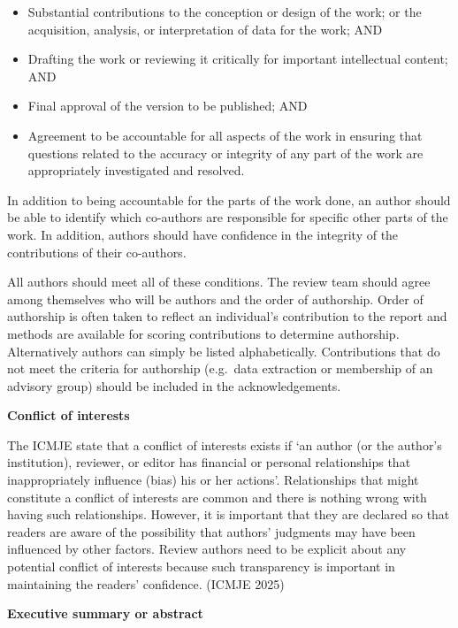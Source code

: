 \documentclass[
  10pt,
  a4paper,
  DIV=11,
  numbers=noendperiod]{scrreprt}
\begin{document}
\begin{itemize}
\item
  Substantial contributions to the conception or design of the work; or
  the acquisition, analysis, or interpretation of data for the work; AND
\item
  Drafting the work or reviewing it critically for important
  intellectual content; AND
\item
  Final approval of the version to be published; AND
\item
  Agreement to be accountable for all aspects of the work in ensuring
  that questions related to the accuracy or integrity of any part of the
  work are appropriately investigated and resolved.
\end{itemize}

In addition to being accountable for the parts of the work done, an
author should be able to identify which co-authors are responsible for
specific other parts of the work. In addition, authors should have
confidence in the integrity of the contributions of their co-authors.

All authors should meet all of these conditions. The review team should
agree among themselves who will be authors and the order of authorship.
Order of authorship is often taken to reflect an individual's
contribution to the report and methods are available for scoring
contributions to determine authorship. Alternatively authors can simply
be listed alphabetically. Contributions that do not meet the criteria
for authorship (e.g.~data extraction or membership of an advisory group)
should be included in the acknowledgements.

\textbf{Conflict of interests}

The ICMJE state that a conflict of interests exists if `an author (or
the author's institution), reviewer, or editor has financial or personal
relationships that inappropriately influence (bias) his or her actions'.
Relationships that might constitute a conflict of interests are common
and there is nothing wrong with having such relationships. However, it
is important that they are declared so that readers are aware of the
possibility that authors' judgments may have been influenced by other
factors. Review authors need to be explicit about any potential conflict
of interests because such transparency is important in maintaining the
readers' confidence. (ICMJE 2025)

\textbf{Executive summary or abstract}
\end{document}
